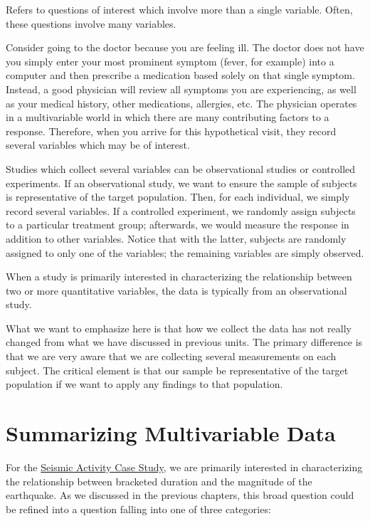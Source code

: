 \documentclass[]{book}
\theoremstyle{plain}
\theoremstyle{mydefn}
\theoremstyle{myexmpl}
\theoremstyle{remark}
\let\BeginKnitrBlock\begin \let\EndKnitrBlock\end
\let\BeginKnitrBlock\begin \let\EndKnitrBlock\end
\begin{document}
\BeginKnitrBlock{definition}[Multivariable]
\protect\hypertarget{def:defn-multivariable}{}{\label{def:defn-multivariable}
{} }Refers to questions of interest which
involve more than a single variable. Often, these questions involve many
variables.
\EndKnitrBlock{definition}

Consider going to the doctor because you are feeling ill. The doctor
does not have you simply enter your most prominent symptom (fever, for
example) into a computer and then prescribe a medication based solely on
that single symptom. Instead, a good physician will review all symptoms
you are experiencing, as well as your medical history, other
medications, allergies, etc. The physician operates in a multivariable
world in which there are many contributing factors to a response.
Therefore, when you arrive for this hypothetical visit, they record
several variables which may be of interest.

Studies which collect several variables can be observational studies or
controlled experiments. If an observational study, we want to ensure the
sample of subjects is representative of the target population. Then, for
each individual, we simply record several variables. If a controlled
experiment, we randomly assign subjects to a particular treatment group;
afterwards, we would measure the response in addition to other
variables. Notice that with the latter, subjects are randomly assigned
to only one of the variables; the remaining variables are simply
observed.

\BeginKnitrBlock{rmdtip}
When a study is primarily interested in characterizing the relationship
between two or more quantitative variables, the data is typically from
an observational study.
\EndKnitrBlock{rmdtip}

What we want to emphasize here is that how we collect the data has not
really changed from what we have discussed in previous units. The
primary difference is that we are very aware that we are collecting
several measurements on each subject. The critical element is that our
sample be representative of the target population if we want to apply
any findings to that population.

\chapter{Summarizing Multivariable Data}\label{Regsummaries}

For the \protect\hyperlink{CaseGreece}{Seismic Activity Case Study}, we
are primarily interested in characterizing the relationship between
bracketed duration and the magnitude of the earthquake. As we discussed
in the previous chapters, this broad question could be refined into a
question falling into one of three categories:
\end{document}
